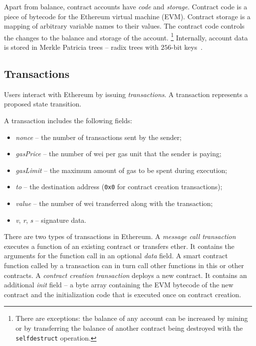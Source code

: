 Apart from balance, contract accounts have \textit{code} and \textit{storage}.
Contract code is a piece of bytecode for the Ethereum virtual machine (EVM).
Contract storage is a mapping of arbitrary variable names to their values.
The contract code controls the changes to the balance and storage of the account.
\footnote{There are exceptions: the balance of any account can be increased by mining or by transferring the balance of another contract being destroyed with the \texttt{selfdestruct} operation.}
Internally, account data is stored in Merkle Patricia trees -- radix trees with $256$-bit keys~\cite{MPTSpec, Buchman14}.


\subsection{Transactions}

Users interact with Ethereum by issuing \textit{transactions}.
A transaction represents a proposed state transition.

A transaction includes the following fields:
\begin{itemize}
	\item \emph{nonce} -- the number of transactions sent by the sender;
	\item \emph{gasPrice} -- the number of wei per gas unit that the sender is paying;
	\item \emph{gasLimit} -- the maximum amount of gas to be spent during execution;
	\item \emph{to} -- the destination address (\texttt{0x0} for contract creation transactions);
	\item \emph{value} -- the number of wei transferred along with the transaction;
	\item \emph{v}, \emph{r}, \emph{s} -- signature data.
\end{itemize}

There are two types of transactions in Ethereum.
A \textit{message call transaction} executes a function of an existing contract or transfers ether.
It contains the arguments for the function call in an optional \textit{data} field.
A smart contract function called by a transaction can in turn call other functions in this or other contracts.
A \textit{contract creation transaction} deploys a new contract.
It contains an additional \emph{init} field -- a byte array containing the EVM bytecode of the new contract and the initialization code that is executed once on contract creation.

